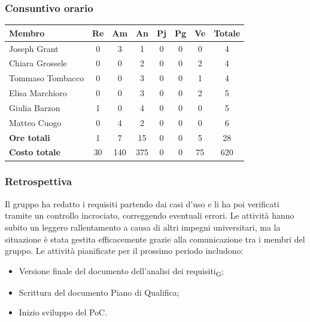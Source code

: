 \documentclass[11pt,a4paper]{article}
\newcommand{\gls}[1]{#1\textsubscript{G}}
\begin{document}
\subsubsection{Consuntivo orario}
\begin{center}
    \begin{tabular}{|l|c|c|c|c|c|c|c|}
        \hline
        \textbf{Membro} & \textbf{Re} & \textbf{Am} & \textbf{An} & \textbf{Pj} & \textbf{Pg} & \textbf{Ve} & \textbf{Totale} \\
        \hline
        Joseph Grant & 0 & 3 & 1 & 0 & 0 & 0 & 4 \\
        \hline
        Chiara Grossele & 0 & 0 & 2 & 0 & 0 & 2 & 4 \\
        \hline
        Tommaso Tombacco & 0 & 0 & 3 & 0 & 0 & 1 & 4 \\
        \hline
        Elisa Marchioro & 0 & 0 & 3 & 0 & 0 & 2 & 5 \\
        \hline
        Giulia Barzon & 1 & 0 & 4 & 0 & 0 & 0 & 5 \\
        \hline
        Matteo Cuogo & 0 & 4 & 2 & 0 & 0 & 0 & 6 \\
        \hline
        \textbf{Ore totali} & 1 & 7 & 15 & 0 & 0 & 5 & 28 \\
        \hline
        \textbf{Costo totale} & 30 & 140 & 375 & 0 & 0 & 75 & 620 \\
        \hline
    \end{tabular}
\end{center}

\subsubsection{Retrospettiva}
Il gruppo ha redatto i requisiti partendo dai casi d’uso e li ha poi verificati tramite un controllo incrociato, correggendo eventuali errori.
Le attività hanno subito un leggero rallentamento a causa di altri impegni universitari, ma la situazione è stata gestita efficacemente grazie alla comunicazione tra i membri del gruppo.
Le attività pianificate per il prossimo periodo includono:
\begin{itemize}
    \item Versione finale del documento dell'\gls{analisi dei requisiti};
    \item Scrittura del documento Piano di Qualifica;
    \item Inizio sviluppo del PoC.
\end{itemize}

\newpage
\end{document}
